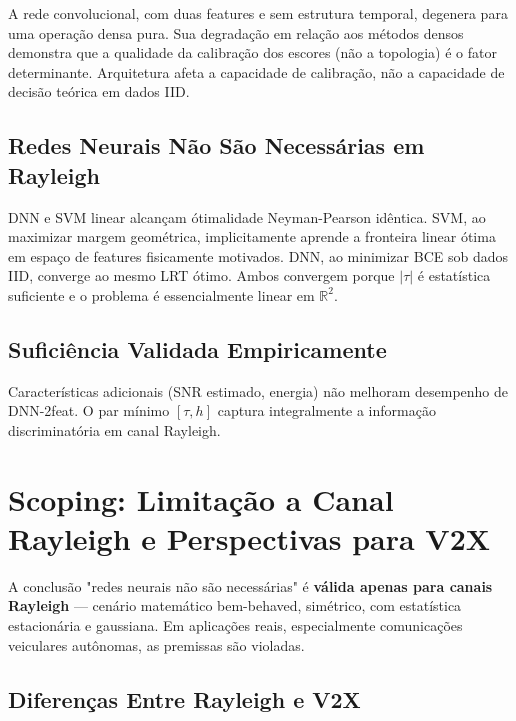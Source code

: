 \documentclass{sbrt}
\begin{document}
A rede convolucional, com duas features e sem estrutura temporal, degenera para uma operação densa pura. Sua degradação em relação aos métodos densos demonstra que a qualidade da calibração dos escores (não a topologia) é o fator determinante. Arquitetura afeta a capacidade de calibração, não a capacidade de decisão teórica em dados IID.

\subsection{Redes Neurais Não São Necessárias em Rayleigh}

DNN e SVM linear alcançam ótimalidade Neyman-Pearson idêntica. SVM, ao maximizar margem geométrica, implicitamente aprende a fronteira linear ótima em espaço de features fisicamente motivados. DNN, ao minimizar BCE sob dados IID, converge ao mesmo LRT ótimo. Ambos convergem porque $|\tau|$ é estatística suficiente e o problema é essencialmente linear em $\mathbb{R}^2$.

\subsection{Suficiência Validada Empiricamente}

Características adicionais (SNR estimado, energia) não melhoram desempenho de DNN-2feat. O par mínimo $[\tau, h]$ captura integralmente a informação discriminatória em canal Rayleigh.

\section{Scoping: Limitação a Canal Rayleigh e Perspectivas para V2X}

A conclusão "redes neurais não são necessárias" é \textbf{válida apenas para canais Rayleigh} --- cenário matemático bem-behaved, simétrico, com estatística estacionária e gaussiana. Em aplicações reais, especialmente comunicações veiculares autônomas, as premissas são violadas.

\subsection{Diferenças Entre Rayleigh e V2X}
\end{document}
